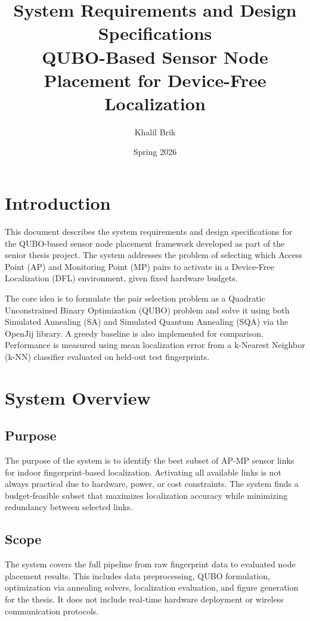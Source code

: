 \documentclass[12pt,a4paper]{article}
\title{
    \textbf{System Requirements and Design Specifications} \\[0.5em]
    \large QUBO-Based Sensor Node Placement for Device-Free Localization
}
\author{Khalil Brik}
\date{Spring 2026}
\begin{document}
\maketitle
\tableofcontents
\newpage

\section{Introduction}

This document describes the system requirements and design specifications for
the QUBO-based sensor node placement framework developed as part of the senior
thesis project. The system addresses the problem of selecting which Access
Point (AP) and Monitoring Point (MP) pairs to activate in a Device-Free
Localization (DFL) environment, given fixed hardware budgets.

The core idea is to formulate the pair selection problem as a Quadratic
Unconstrained Binary Optimization (QUBO) problem and solve it using both
Simulated Annealing (SA) and Simulated Quantum Annealing (SQA) via the
OpenJij library. A greedy baseline is also implemented for comparison.
Performance is measured using mean localization error from a k-Nearest
Neighbor (k-NN) classifier evaluated on held-out test fingerprints.

\section{System Overview}

\subsection{Purpose}

The purpose of the system is to identify the best subset of AP-MP sensor
links for indoor fingerprint-based localization. Activating all available
links is not always practical due to hardware, power, or cost constraints.
The system finds a budget-feasible subset that maximizes localization accuracy
while minimizing redundancy between selected links.

\subsection{Scope}

The system covers the full pipeline from raw fingerprint data to evaluated
node placement results. This includes data preprocessing, QUBO formulation,
optimization via annealing solvers, localization evaluation, and figure
generation for the thesis. It does not include real-time hardware deployment
or wireless communication protocols.
\end{document}
